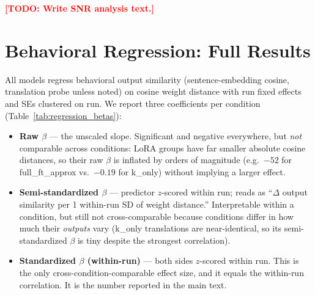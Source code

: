 \documentclass{article}
\newcommand{\TODO}[1]{\textcolor{red}{\textbf{[TODO: #1]}}}
\begin{document}
\TODO{Write SNR analysis text.}

\section{Behavioral Regression: Full Results}
\label{app:regression}

All models regress behavioral output similarity (sentence-embedding cosine, translation probe
unless noted) on cosine weight distance with run fixed effects and SEs clustered on run. We report
three coefficients per condition (Table~\ref{tab:regression_betas}):
\begin{itemize}
  \item \textbf{Raw $\beta$} --- the unscaled slope. Significant and negative everywhere, but
    \emph{not} comparable across conditions: LoRA groups have far smaller absolute cosine distances,
    so their raw $\beta$ is inflated by orders of magnitude (e.g.\ $-52$ for full\_ft\_approx vs.\
    $-0.19$ for k\_only) without implying a larger effect.
  \item \textbf{Semi-standardized $\beta$} --- predictor $z$-scored within run; reads as ``$\Delta$
    output similarity per 1 within-run SD of weight distance.'' Interpretable within a condition,
    but still not cross-comparable because conditions differ in how much their \emph{outputs} vary
    (k\_only translations are near-identical, so its semi-standardized $\beta$ is tiny despite the
    strongest correlation).
  \item \textbf{Standardized $\beta$ (within-run)} --- both sides $z$-scored within run. This is the
    only cross-condition-comparable effect size, and it equals the within-run correlation. It is the
    number reported in the main text.
\end{itemize}
\end{document}
